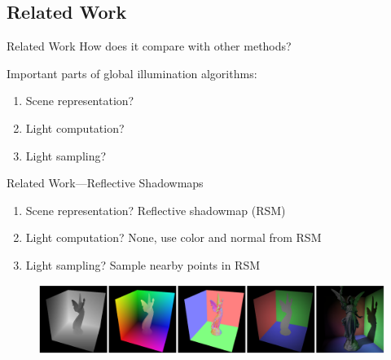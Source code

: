 \documentclass[10pt]{beamer}
\begin{document}
\subsection{Related Work}
\begin{frame}{Related Work}
  How does it compare with other methods?
  \vspace{1cm}

  Important parts of global illumination algorithms:
  \begin{enumerate}
    \item Scene representation? %
    \item Light computation? %
    \item Light sampling? %
  \end{enumerate}
\end{frame}

\begin{frame}{Related Work---Reflective Shadowmaps}
  \begin{enumerate}
    \item Scene representation? \alert{Reflective shadowmap (RSM)}%
    \item Light computation? \alert{None, use color and normal from RSM}%
    \item Light sampling? \alert{Sample nearby points in RSM} %
  \end{enumerate}

  \begin{figure}
    \includegraphics[width=\textwidth]{rsm}
  \end{figure}

\end{frame}
\end{document}
